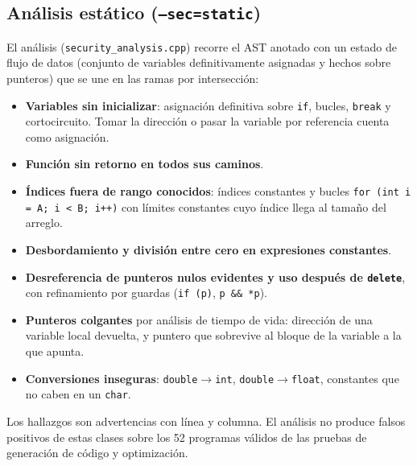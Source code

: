 \documentclass[11pt,a4paper]{article}
\newcommand{\cod}[1]{\texttt{#1}}
\begin{document}
\subsection{Análisis estático (\cod{--sec=static})}
El análisis (\cod{security\_analysis.cpp}) recorre el AST anotado con un estado de flujo de datos (conjunto de
variables definitivamente asignadas y hechos sobre punteros) que se une en las ramas por intersección:
\begin{itemize}
  \item \textbf{Variables sin inicializar}: asignación definitiva sobre \cod{if}, bucles, \cod{break} y
        cortocircuito. Tomar la dirección o pasar la variable por referencia cuenta como asignación.
  \item \textbf{Función sin retorno en todos sus caminos}.
  \item \textbf{Índices fuera de rango conocidos}: índices constantes y bucles
        \cod{for (int i = A; i < B; i++)} con límites constantes cuyo índice llega al tamaño del arreglo.
  \item \textbf{Desbordamiento y división entre cero en expresiones constantes}.
  \item \textbf{Desreferencia de punteros nulos evidentes y uso después de \cod{delete}}, con refinamiento por guardas
        (\cod{if (p)}, \cod{p \&\& *p}).
  \item \textbf{Punteros colgantes} por análisis de tiempo de vida: dirección de una variable local devuelta, y
        puntero que sobrevive al bloque de la variable a la que apunta.
  \item \textbf{Conversiones inseguras}: \cod{double}$\to$\cod{int}, \cod{double}$\to$\cod{float}, constantes que no
        caben en un \cod{char}.
\end{itemize}
Los hallazgos son advertencias con línea y columna. El análisis no produce falsos positivos de estas clases sobre
los 52 programas válidos de las pruebas de generación de código y optimización.
\end{document}
